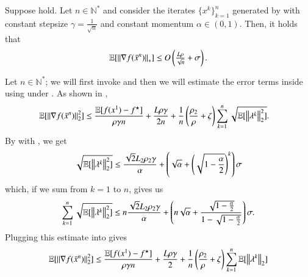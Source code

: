 \begin{lemmarep}\label{lem:uSCGrate1}
    Suppose  hold. Let $n\in\mathbb{N}^*$ and consider the iterates $\{x^k\}_{k=1}^n$ generated by  with constant stepsize $\gamma = \frac{1}{\sqrt{n}}$ and constant momentum $\alpha\in(0,1)$.
    Then, it holds that
    \begin{equation*}
        \mathbb{E}[\left\Vert{\nabla f(\bar{x}^n)}\right\Vert_{\ast}] \leq O\left(\tfrac{L\rho}{\sqrt{n}}+\sigma\right).
    \end{equation*}
\end{lemmarep}
\begin{appendixproof}
    Let $n\in\mathbb{N}^*$; we will first invoke  and then we will estimate the error terms inside using  under .
    As shown in ,
    \begin{equation}\label{eq:uSCGrate1}
        \begin{aligned}
            \mathbb{E}[\left\Vert{\nabla f(\bar{x}^n)}\right\Vert_2^2]
                &\leq \frac{\mathbb{E}[f(x^{1})-f^\star]}{\rho\gamma n} +\frac{L\rho\gamma}{2n} + \frac{1}{n}\left(\frac{\rho_2}{\rho}+\zeta\right)\sum\limits_{k=1}^n\sqrt{\mathbb{E}[\left\Vert{\lambda^{k}}\right\Vert_2^2]}.
            \end{aligned}
    \end{equation}
    By  with , we get
    \begin{equation*}
        \sqrt{\mathbb{E}[\left\Vert{\lambda^k}\right\Vert_2^2]}
            \leq \frac{\sqrt{2}L_2\rho_2\gamma}{\alpha} + \left(\sqrt{\alpha} + \left(\sqrt{1-\frac{\alpha}{2}}\right)^k\right)\sigma
    \end{equation*}
    which, if we sum from $k=1$ to $n$, gives us
    \begin{equation*}
        \sum\limits_{k=1}^n\sqrt{\mathbb{E}[\left\Vert{\lambda^k}\right\Vert_2^2]}
            \leq n\frac{\sqrt{2}L_2\rho_2\gamma}{\alpha} + \left(n\sqrt{\alpha} + \frac{\sqrt{1-\frac{\alpha}{2}}}{1-\sqrt{1-\frac{\alpha}{2}}}\right)\sigma.
    \end{equation*}
    Plugging this estimate into  gives
    \begin{equation}\label{eq:uSCGfinalineq}
        \begin{aligned}
            \mathbb{E}[\norm{\nabla f(\bar{x}^n)}_2^2]
                &\leq \frac{\mathbb{E}[f(x^{1})-\fmin]}{\rho\gamma n} +\frac{L\rho\gamma}{2} + \frac{1}{n}\left(\frac{\rho_2}{\rho}+\zeta\right)\sum\limits_{k=1}^n\mathbb{E}[\norm{\lambda^{k}}_2]\\

\end{aligned}
\end{equation}
\end{appendixproof}
